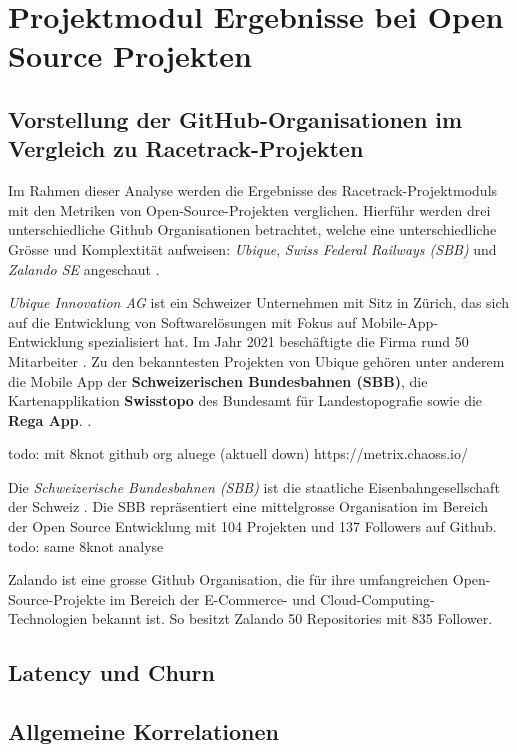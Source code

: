 \section{Projektmodul Ergebnisse bei Open Source Projekten}
\subsection{Vorstellung der GitHub-Organisationen im Vergleich zu Racetrack-Projekten}
Im Rahmen dieser Analyse werden die Ergebnisse des Racetrack-Projektmoduls mit den Metriken von Open-Source-Projekten verglichen. Hierführ werden drei unterschiedliche Github Organisationen betrachtet, welche eine unterschiedliche Grösse und Komplextität aufweisen: \textit{Ubique}, \textit{Swiss Federal Railways (SBB)} und \textit{
Zalando SE} angeschaut \parencite{noauthor_ubique_nodate} \parencite{noauthor_swiss_nodate} \parencite{noauthor_zalando_nodate}. 


\textit{Ubique Innovation AG} ist ein Schweizer Unternehmen mit Sitz in Zürich, das sich auf die Entwicklung von Softwarelösungen mit Fokus auf Mobile-App-Entwicklung spezialisiert hat. Im Jahr 2021 beschäftigte die Firma rund 50 Mitarbeiter \cite{noauthor_mathias_2021}. Zu den bekanntesten Projekten von Ubique gehören unter anderem die Mobile App der \textbf{Schweizerischen Bundesbahnen (SBB)}, die Kartenapplikation \textbf{Swisstopo} des Bundesamt für Landestopografie sowie die \textbf{Rega App}. \parencite{noauthor_apps_nodate}.

todo: mit 8knot github org aluege (aktuell down) 
https://metrix.chaoss.io/

Die \textit{Schweizerische Bundesbahnen (SBB)} ist die staatliche Eisenbahngesellschaft der Schweiz \parencite{uvek_schweizerische_nodate}. Die SBB repräsentiert eine mittelgrosse Organisation im Bereich der Open Source Entwicklung mit 104 Projekten und 137 Followers auf Github. \parencite{noauthor_swiss_nodate} 
todo: same 8knot analyse

Zalando ist eine grosse Github Organisation, die für ihre umfangreichen Open-Source-Projekte im Bereich der E-Commerce- und Cloud-Computing-Technologien bekannt ist. So besitzt Zalando 50 Repositories mit 835 Follower. \parencite{noauthor_zalando_nodate}

\subsection{Latency und Churn}
\subsection{Allgemeine Korrelationen}

